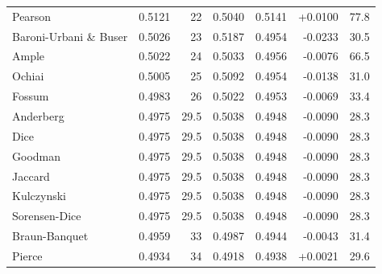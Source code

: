 \begin{table}[t]
{\begin{tabular}{lrrrrrr}
Pearson & 0.5121 & 22 & 0.5040 & 0.5141 & +0.0100 & 77.8 \\
Baroni-Urbani \& Buser & 0.5026 & 23 & 0.5187 & 0.4954 & -0.0233 & 30.5 \\
Ample & 0.5022 & 24 & 0.5033 & 0.4956 & -0.0076 & 66.5 \\
Ochiai & 0.5005 & 25 & 0.5092 & 0.4954 & -0.0138 & 31.0 \\
Fossum & 0.4983 & 26 & 0.5022 & 0.4953 & -0.0069 & 33.4 \\
Anderberg & 0.4975 & 29.5 & 0.5038 & 0.4948 & -0.0090 & 28.3 \\
Dice & 0.4975 & 29.5 & 0.5038 & 0.4948 & -0.0090 & 28.3 \\
Goodman & 0.4975 & 29.5 & 0.5038 & 0.4948 & -0.0090 & 28.3 \\
Jaccard & 0.4975 & 29.5 & 0.5038 & 0.4948 & -0.0090 & 28.3 \\
Kulczynski & 0.4975 & 29.5 & 0.5038 & 0.4948 & -0.0090 & 28.3 \\
Sorensen-Dice & 0.4975 & 29.5 & 0.5038 & 0.4948 & -0.0090 & 28.3 \\
Braun-Banquet & 0.4959 & 33 & 0.4987 & 0.4944 & -0.0043 & 31.4 \\
Pierce & 0.4934 & 34 & 0.4918 & 0.4938 & +0.0021 & 29.6 \\
\bottomrule
\end{tabular}
}
\end{table}
